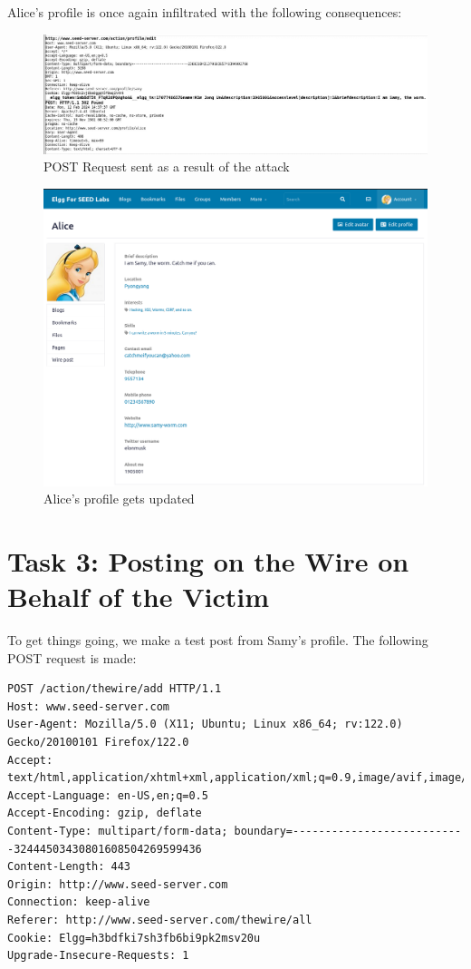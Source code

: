 \documentclass[12pt]{article}
\begin{document}
Alice's profile is once again infiltrated with the following consequences:
     \begin{figure}[H]
         \centering
         \includegraphics[width=\textwidth]{Images/ss8.png}
         \caption{POST Request sent as a result of the attack}
         \label{fig:ss8}
     \end{figure}
     \begin{figure}[H]
         \centering
         \includegraphics[width=\textwidth]{Images/ss3.png}
         \caption{Alice's profile gets updated}
         \label{fig:ss3}
     \end{figure}

\newpage


\section*{Task 3: Posting on the Wire on Behalf of the Victim}
To get things going, we make a test post from Samy's profile. The following POST request is made:

\begin{verbatim}
POST /action/thewire/add HTTP/1.1
Host: www.seed-server.com
User-Agent: Mozilla/5.0 (X11; Ubuntu; Linux x86_64; rv:122.0) Gecko/20100101 Firefox/122.0
Accept: text/html,application/xhtml+xml,application/xml;q=0.9,image/avif,image/webp,*/*;q=0.8
Accept-Language: en-US,en;q=0.5
Accept-Encoding: gzip, deflate
Content-Type: multipart/form-data; boundary=---------------------------32444503430801608504269599436
Content-Length: 443
Origin: http://www.seed-server.com
Connection: keep-alive
Referer: http://www.seed-server.com/thewire/all
Cookie: Elgg=h3bdfki7sh3fb6bi9pk2msv20u
Upgrade-Insecure-Requests: 1
\end{verbatim}
\end{document}
